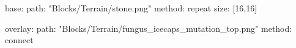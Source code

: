 base:
  path: "Blocks/Terrain/stone.png"
  method: repeat
  size: [16,16]

overlay:
  path: "Blocks/Terrain/fungus_icecaps_mutation_top.png"
  method: connect
